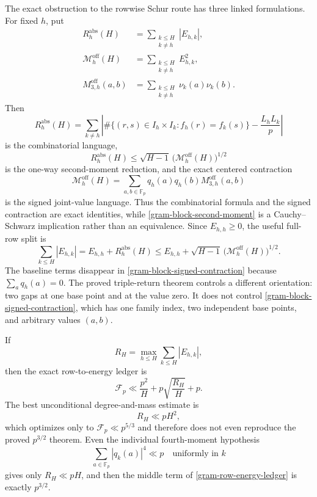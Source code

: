 \begin{remark}
\label{gram-blocking-terms}
The exact obstruction to the rowwise Schur route has three linked
formulations.  For fixed $h$, put
\begin{align*}
 R_h^{\mathrm{abs}}(H)
 &=\sum_{\substack{k\le H\\k\ne h}}|E_{h,k}|,\\
 \mathcal M_h^{\mathrm{off}}(H)
 &=\sum_{\substack{k\le H\\k\ne h}}E_{h,k}^2,\\
 M_{3,h}^{\mathrm{off}}(a,b)
 &=\sum_{\substack{k\le H\\k\ne h}}\nu_k(a)\nu_k(b).
\end{align*}
Then
\begin{equation}
 R_h^{\mathrm{abs}}(H)
 =\sum_{k\ne h}
 \left|
 \#\{(r,s)\in I_h\times I_k:f_h(r)=f_k(s)\}
 -\frac{L_hL_k}{p}
 \right|
 \label{gram-block-combinatorial}
\end{equation}
is the combinatorial language,
\begin{equation}
 R_h^{\mathrm{abs}}(H)
 \le\sqrt{H-1}\,
 \bigl(\mathcal M_h^{\mathrm{off}}(H)\bigr)^{1/2}
 \label{gram-block-second-moment}
\end{equation}
is the one-way second-moment reduction, and the exact centered
contraction
\begin{equation}
 \mathcal M_h^{\mathrm{off}}(H)
 =\sum_{a,b\in\mathbb F_p}
 q_h(a)q_h(b)M_{3,h}^{\mathrm{off}}(a,b)
 \label{gram-block-signed-contraction}
\end{equation}
is the signed joint-value language.  Thus the combinatorial formula and
the signed contraction are exact identities, while
\eqref{gram-block-second-moment} is a Cauchy--Schwarz implication rather
than an equivalence.  Since $E_{h,h}\ge0$, the useful full-row split is
\begin{equation}
 \sum_{k\le H}|E_{h,k}|
 =E_{h,h}+R_h^{\mathrm{abs}}(H)
 \le E_{h,h}+\sqrt{H-1}\,
 \bigl(\mathcal M_h^{\mathrm{off}}(H)\bigr)^{1/2}.
 \label{gram-block-diagonal-split}
\end{equation}
The baseline terms disappear in
\eqref{gram-block-signed-contraction} because $\sum_aq_h(a)=0$.
The proved triple-return theorem controls a different orientation: two
gaps at one base point and at the value zero.  It does not control
\eqref{gram-block-signed-contraction}, which has one family index, two
independent base points, and arbitrary values $(a,b)$.

If
\[
 R_H=\max_{h\le H}\sum_{k\le H}|E_{h,k}|,
\]
then the exact row-to-energy ledger is
\begin{equation}
 \mathcal F_p
 \ll\frac{p^2}{H}
   +p\sqrt{\frac{R_H}{H}}+p.
 \label{gram-row-energy-ledger}
\end{equation}
The best unconditional degree-and-mass estimate is
\[
 R_H\ll pH^2,
\]
which optimizes only to $\mathcal F_p\ll p^{5/3}$ and therefore does not
even reproduce the proved $p^{3/2}$ theorem.  Even the individual
fourth-moment hypothesis
\[
 \sum_{a\in\mathbb F_p}|q_k(a)|^4\ll p
 \quad\text{uniformly in }k
\]
gives only $R_H\ll pH$, and then the middle term of
\eqref{gram-row-energy-ledger} is exactly $p^{3/2}$.


\end{remark}
